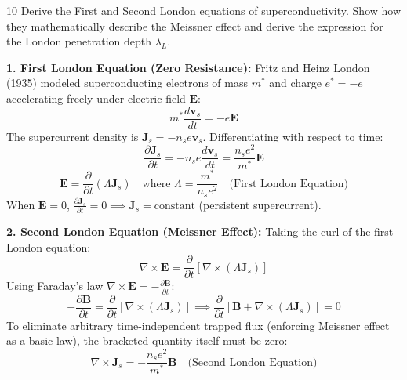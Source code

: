 \begin{theoryq}{10}
Derive the First and Second London equations of superconductivity. Show how they mathematically describe the Meissner effect and derive the expression for the London penetration depth $\lambda_L$.
\end{theoryq}
\begin{theorysol}
\textbf{1. First London Equation (Zero Resistance):}
Fritz and Heinz London (1935) modeled superconducting electrons of mass $m^*$ and charge $e^* = -e$ accelerating freely under electric field $\mathbf{E}$:
\begin{equation}
m^* \frac{d\mathbf{v}_s}{dt} = -e\mathbf{E}
\end{equation}
The supercurrent density is $\mathbf{J}_s = -n_s e \mathbf{v}_s$. Differentiating with respect to time:
\begin{equation}
\frac{\partial \mathbf{J}_s}{\partial t} = -n_s e \frac{d\mathbf{v}_s}{dt} = \frac{n_s e^2}{m^*} \mathbf{E}
\end{equation}
\begin{equation}
\mathbf{E} = \frac{\partial}{\partial t}(\Lambda \mathbf{J}_s)\quad \text{where } \Lambda = \frac{m^*}{n_s e^2}\quad \text{(First London Equation)}
\end{equation}
When $\mathbf{E} = 0$, $\frac{\partial \mathbf{J}_s}{\partial t} = 0 \implies \mathbf{J}_s = \text{constant}$ (persistent supercurrent).

\textbf{2. Second London Equation (Meissner Effect):}
Taking the curl of the first London equation:
\begin{equation}
\nabla \times \mathbf{E} = \frac{\partial}{\partial t}\left[\nabla \times (\Lambda \mathbf{J}_s)\right]
\end{equation}
Using Faraday's law $\nabla \times \mathbf{E} = -\frac{\partial \mathbf{B}}{\partial t}$:
\begin{equation}
-\frac{\partial \mathbf{B}}{\partial t} = \frac{\partial}{\partial t}\left[\nabla \times (\Lambda \mathbf{J}_s)\right] \implies \frac{\partial}{\partial t}\left[\mathbf{B} + \nabla \times (\Lambda \mathbf{J}_s)\right] = 0
\end{equation}
To eliminate arbitrary time-independent trapped flux (enforcing Meissner effect as a basic law), the bracketed quantity itself must be zero:
\begin{equation}
\nabla \times \mathbf{J}_s = -\frac{n_s e^2}{m^*} \mathbf{B}\quad \text{(Second London Equation)}
\end{equation}


\end{theorysol}
